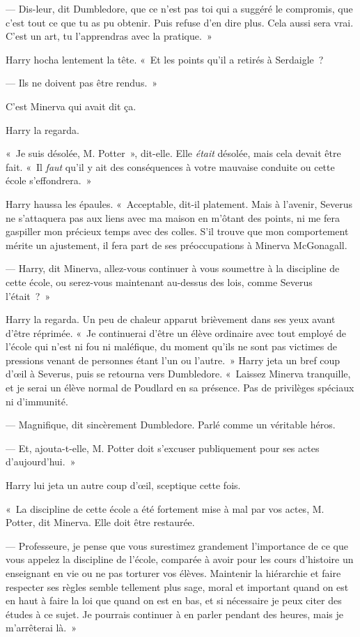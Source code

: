 --- Dis-leur, dit Dumbledore, que ce n'est pas toi qui a suggéré le compromis, que c'est tout ce que tu as pu obtenir.
Puis refuse d'en dire plus.
Cela aussi sera vrai.
C'est un art, tu l'apprendras avec la pratique.~»

Harry hocha lentement la tête.
«~Et les points qu'il a retirés à Serdaigle~?

--- Ils ne doivent pas être rendus.~»

C'est Minerva qui avait dit ça.

Harry la regarda.

«~Je suis désolée, M. Potter~», dit-elle.
Elle \emph{était} désolée, mais cela devait être fait.
«~Il \emph{faut} qu'il y ait des conséquences à votre mauvaise conduite ou cette école s'effondrera.~»

Harry haussa les épaules.
«~Acceptable, dit-il platement.
Mais à l'avenir, Severus ne s'attaquera pas aux liens avec ma maison en m'ôtant des points, ni me fera gaspiller mon précieux temps avec des colles.
S'il trouve que mon comportement mérite un ajustement, il fera part de ses préoccupations à Minerva McGonagall.

--- Harry, dit Minerva, allez-vous continuer à vous soumettre à la discipline de cette école, ou serez-vous maintenant au-dessus des lois, comme Severus l'était~?~»

Harry la regarda.
Un peu de chaleur apparut brièvement dans ses yeux avant d'être réprimée.
«~Je continuerai d'être un élève ordinaire avec tout employé de l'école qui n'est ni fou ni maléfique, du moment qu'ils ne sont pas victimes de pressions venant de personnes étant l'un ou l'autre.~»
Harry jeta un bref coup d'œil à Severus, puis se retourna vers Dumbledore.
«~Laissez Minerva tranquille, et je serai un élève normal de Poudlard en sa présence.
Pas de privilèges spéciaux ni d'immunité.

--- Magnifique, dit sincèrement Dumbledore.
Parlé comme un véritable héros.

--- Et, ajouta-t-elle, M. Potter doit s'excuser publiquement pour ses actes d'aujourd'hui.~»

Harry lui jeta un autre coup d'œil, sceptique cette fois.

«~La discipline de cette école a été fortement mise à mal par vos actes, M. Potter, dit Minerva.
Elle doit être restaurée.

--- Professeure, je pense que vous surestimez grandement l'importance de ce que vous appelez la discipline de l'école, comparée à avoir pour les cours d'histoire un enseignant en vie ou ne pas torturer vos élèves.
Maintenir la hiérarchie et faire respecter ses règles semble tellement plus sage, moral et important quand on est en haut à faire la loi que quand on est en bas, et si nécessaire je peux citer des études à ce sujet.
Je pourrais continuer à en parler pendant des heures, mais je m'arrêterai là.~»

